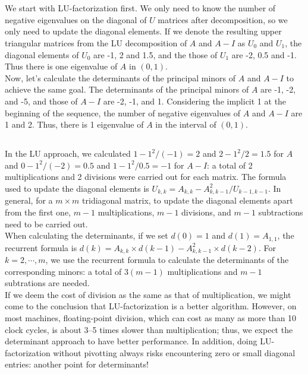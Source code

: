 \documentclass[11pt]{article}
\begin{document}
\maketitle
\section{}
\subsection{}
We start with LU-factorization first. We only need to know the number of negative eigenvalues on the diagonal of $U$ matrices after decomposition, so we only need to update the diagonal elements. If we denote the resulting upper triangular matrices from the LU decomposition of $A$ and $A-I$ as $U_0$ and $U_1$, the diagonal elements of $U_0$ are -1, 2 and 1.5, and the those of $U_1$ are -2, 0.5 and -1. Thus there is one eigenvalue of $A$ in $(0,1)$.\\[0.3cm]
Now, let's calculate the determinants of the principal minors of $A$ and $A-I$ to achieve the same goal. The determinants of the principal minors of $A$ are -1, -2, and -5, and those of $A-I$ are -2, -1, and 1. Considering the implicit 1 at the beginning of the sequence, the number of negative eigenvalues of $A$ and $A-I$ are 1 and 2. Thus, there is 1 eigenvalue of $A$ in the interval of $(0,1)$.

\subsection{}
In the LU approach, we calculated $1 - 1^2/(-1) = 2$ and $2 - 1^2/2 = 1.5$ for $A$ and $0-1^2/(-2) = 0.5$ and $1-1^2/0.5 = -1$ for $A-I$: a total of 2 multiplications and 2 divisions were carried out for each matrix. The formula used to update the diagonal elements is $U_{k,k} = A_{k,k} - A_{k,k-1}^2/U_{k-1,k-1}.$ In general, for a $m\times m$ tridiagonal matrix, to update the diagonal elements apart from the first one, $m-1$ multiplications, $m-1$ divisions, and $m-1$ subtractions need to be carried out.\\[0.3cm]
When calculating the determinants, if we set $d(0)=1$ and $d(1)=A_{1,1}$, the recurrent formula is $d(k) = A_{k,k}\times d(k-1)-A_{k,k-1}^2 \times d(k-2)$. For $k=2,\cdots,m$, we use the recurrent formula to calculate the determinants of the corresponding minors: a total of $3(m-1)$ multiplications and $m-1$ subtrations are needed.\\[0.3cm]
If we deem the cost of division as the same as that of multiplication, we might come to the conclusion that LU-factorization is a better algorithm. However, on most machines, floating-point division, which can cost as many as more than 10 clock cycles, is about 3--5 times slower than multiplication; thus, we expect the determinant approach to have better performance. In addition, doing LU-factorization without pivotting always risks encountering zero or small diagonal entries: another point for determinants!
\end{document}
